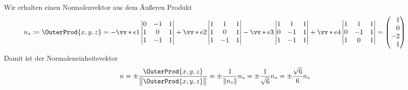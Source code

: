 \documentclass[../full]{subfiles}
\begin{document}

    Wir erhalten einen Normalenvektor aus dem \"Au\ss eren Produkt
    \begin{gather*}
        n_*
        \coloneqq \OuterProd{x, y, z}
        = -\StandardVect{1} \begin{vmatrix}
            0 & -1 & 1 \\
            1 &  0 & 1 \\
            1 & -1 & 1
        \end{vmatrix} %
        + \StandardVect{2} \begin{vmatrix}
            1 &  1 & 1 \\
            1 &  0 & 1 \\
            1 & -1 & 1
        \end{vmatrix} %
        - \StandardVect{3} \begin{vmatrix}
            1 &  1 & 1 \\
            0 & -1 & 1 \\
            1 & -1 & 1
        \end{vmatrix} %
        + \StandardVect{4} \begin{vmatrix}
            1 &  1 & 1 \\
            0 & -1 & 1 \\
            1 &  0 & 1
        \end{vmatrix} %
        = \begin{pmatrix}
            \phantom{-}1 \\ \phantom{-}0 \\ -2 \\ \phantom{-}1
        \end{pmatrix}
    \end{gather*}
    Damit ist der Normaleneinheitsvektor
    \begin{equation*}
        n = \pm \frac{\OuterProd{x, y, z}}{\norm[\big]{\OuterProd{x, y, z}}}
        = \pm \frac{1}{\norm{n_*}} n_*
        = \pm \frac{1}{\sqrt{6}} n_*
        = \pm \frac{\sqrt{6}}{6} n_*
    \end{equation*}
\end{document}
